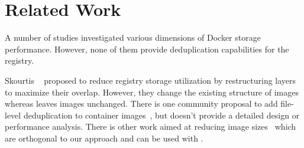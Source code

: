 \section{Related Work}
\label{sec:related}


A number of studies investigated various dimensions of Docker storage
performance\cite{slacker,docker-driver-eval,improve-cow-container-drivers,dockerworkload,dedupanalysis,shifter,exoclones}. However, none
of them provide deduplication capabilities for the registry.

Skourtis \etal~\cite{skourtis2019carving} proposed to reduce registry storage utilization by
restructuring layers to maximize their overlap. However, they change
the existing structure of images whereas \sysname leaves images unchanged.
%
%
%
There is one community proposal to add file-level deduplication to container
images~\cite{Krohmer-proposal}, but doesn't provide a detailed design or performance
analysis.
%
There is other work aimed at reducing image sizes~\cite{cntr,rastogi2017cimplifier,gschwind2017optimizing,dockerslim} which are orthogonal to our approach and can be used  with \sysname.
%
%
